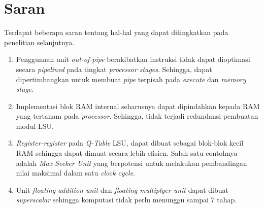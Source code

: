 \section{Saran}
Terdapat beberapa saran tentang hal-hal yang dapat ditingkatkan pada penelitian selanjutnya.
\begin{enumerate}
	\item Penggunaan unit \textit{out-of-pipe} berakibatkan instruksi tidak dapat dioptimasi secara \textit{pipelined} pada tingkat \textit{processor stages}. Sehingga, dapat dipertimbangkan untuk membuat \textit{pipe} terpisah pada \textit{execute} dan \textit{memory stage}.
	\item Implementasi blok \ac{RAM} internal seharusnya dapat dipindahkan kepada \ac{RAM} yang tertanam pada \textit{processor}. Sehingga, tidak terjadi redundansi pembuatan modul \ac{LSU}.
	\item \textit{Register-register} pada \textit{Q-Table} \ac{LSU}, dapat dibuat sebagai blok-blok kecil \ac{RAM} sehingga dapat dimuat secara lebih efisien. Salah satu contohnya adalah \textit{Max Seeker Unit} yang berpotensi untuk melakukan pembandingan nilai maksimal dalam satu \textit{clock cycle}.
	\item Unit \textit{floating addition unit} dan \textit{floating multiplyer unit} dapat dibuat \textit{superscalar} sehingga komputasi tidak perlu menunggu sampai 7 tahap.
\end{enumerate}
